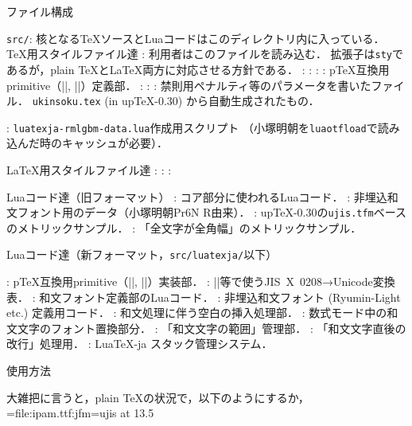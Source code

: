 \enditem


\beginparagraph ファイル構成

\item {\tt src/}: 核となる\TeX ソースとLuaコードはこのディレクトリ内に入っている．
\itemitem \TeX 用スタイルファイル達
: 利用者はこのファイルを読み込む．
拡張子は{\tt sty}であるが，plain \TeX と\LaTeX 両方に対応させる方針である．
: 
: 
: 
: p\TeX 互換用primitive（|\euc|, |\kansuji|）定義部．
: 
: 
: 禁則用ペナルティ等のパラメータを書いたファイル．
{\tt ukinsoku.tex} (in up\TeX-0.30) から自動生成されたもの．

: {\tt luatexja-rmlgbm-data.lua}作成用スクリプト
{\small（小塚明朝を{\tt luaotfload}で読み込んだ時のキャッシュが必要）\inhibitglue}．

\itemitem \LaTeX 用スタイルファイル達
: 
: 
: 


\itemitem Luaコード達（旧フォーマット）
: コア部分に使われるLuaコード．
: 非埋込和文フォント用のデータ（小塚明朝Pr6N R由来）．
: up\TeX-0.30の{\tt ujis.tfm}ベースのメトリックサンプル．
: 「全文字が全角幅」のメトリックサンプル．

\itemitem Luaコード達（新フォーマット，{\tt src/luatexja/}以下）

: p\TeX 互換用primitive（|\euc|, |\kansuji|）実装部．
: |\euc|等で使うJIS~X~0208→Unicode変換表．
: 和文フォント定義部のLuaコード．
: 非埋込和文フォント (Ryumin-Light etc.) 定義用コード．
: 和文処理に伴う空白の挿入処理部．
: 数式モード中の和文文字のフォント置換部分．
: 「和文文字の範囲」管理部．
: 「和文文字直後の改行」処理用．
: Lua\TeX-ja スタック管理システム．
\enditem

\beginsection 使用方法

大雑把に言うと，plain \TeX の状況で，以下のようにするか，
\begintt
\jfont\tenipam={file:ipam.ttf:jfm=ujis} at 13.5\jQ 
\tenipam{}\zw 

